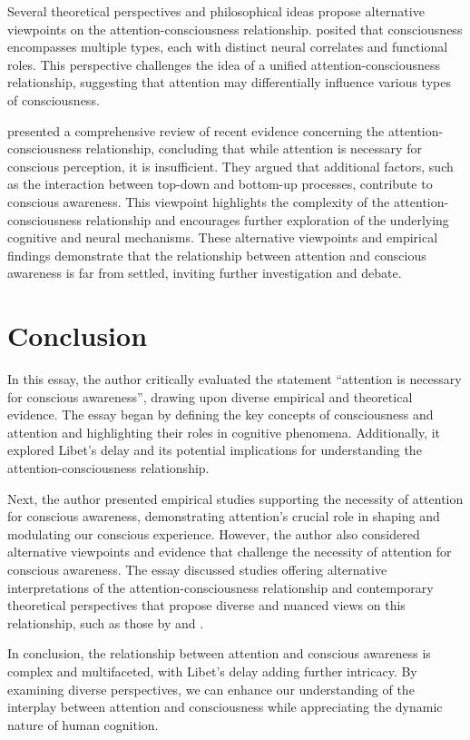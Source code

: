 \documentclass[10pt]{article}
\begin{document}
\begin{sloppypar}
  Several theoretical perspectives and philosophical ideas propose alternative viewpoints on the attention-consciousness relationship. \cite{montemayor_types_2021} posited that consciousness encompasses multiple types, each with distinct neural correlates and functional roles. This perspective challenges the idea of a unified attention-consciousness relationship, suggesting that attention may differentially influence various types of consciousness.

  \cite{noah_recent_2020} presented a comprehensive review of recent evidence concerning the attention-consciousness relationship, concluding that while attention is necessary for conscious perception, it is insufficient. They argued that additional factors, such as the interaction between top-down and bottom-up processes, contribute to conscious awareness. This viewpoint highlights the complexity of the attention-consciousness relationship and encourages further exploration of the underlying cognitive and neural mechanisms. These alternative viewpoints and empirical findings demonstrate that the relationship between attention and conscious awareness is far from settled, inviting further investigation and debate.

  \section{Conclusion}
  \label{sec:conclusion}

  In this essay, the author critically evaluated the statement “attention is necessary for conscious awareness”, drawing upon diverse empirical and theoretical evidence. The essay began by defining the key concepts of consciousness and attention and highlighting their roles in cognitive phenomena. Additionally, it explored Libet’s delay and its potential implications for understanding the attention-consciousness relationship.

  Next, the author presented empirical studies supporting the necessity of attention for conscious awareness, demonstrating attention’s crucial role in shaping and modulating our conscious experience. However, the author also considered alternative viewpoints and evidence that challenge the necessity of attention for conscious awareness. The essay discussed studies offering alternative interpretations of the attention-consciousness relationship and contemporary theoretical perspectives that propose diverse and nuanced views on this relationship, such as those by \cite{montemayor_types_2021} and \cite{noah_recent_2020}.

  In conclusion, the relationship between attention and conscious awareness is complex and multifaceted, with Libet’s delay adding further intricacy. By examining diverse perspectives, we can enhance our understanding of the interplay between attention and consciousness while appreciating the dynamic nature of human cognition.

  \pagebreak
  \singlespacing %
  
  

\end{sloppypar}
\end{document}
